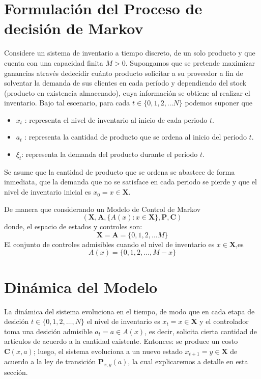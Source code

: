 \documentclass[
  us-letterpaper,
  DIV=11,
  numbers=noendperiod]{scrreprt}
\begin{document}

\chapter{Formulación del Proceso de decisión de
Markov}\label{formulaciuxf3n-del-proceso-de-decisiuxf3n-de-markov}

Considere un sistema de inventario a tiempo discreto, de un solo
producto y que cuenta con una capacidad finita \(M>0\). Supongamos que
se pretende maximizar ganancias através dedecidir cuánto producto
solicitar a su proveedor a fin de solventar la demanda de sus clientes
en cada período y dependiendo del stock (producto en existencia
almacenado), cuya información se obtiene al realizar el inventario. Bajo
tal escenario, para cada \(t\in \{0,1,2, \dotso N\}\) podemos suponer
que

\begin{itemize}
\item
  \(x_t\) : representa el nivel de inventario al inicio de cada periodo
  \(t\).
\item
  \(a_t\) : representa la cantidad de producto que se ordena al inicio
  del periodo \(t\).
\item
  \(\xi_t\): representa la demanda del producto durante el periodo
  \(t\).
\end{itemize}

Se asume que la cantidad de producto que se ordena se abastece de forma
inmediata, que la demanda que no se satisface en cada periodo se pierde
y que el nivel de inventario inicial es \(x_0=x \in \mathbf{X}\).

De manera que considerando un Modelo de Control de Markov
\[( \mathbf{X}, \mathbf{A}, \{A(x): x \in \mathbf{X}\}, \mathbf{P},\mathbf{C})\]
donde, el espacio de estados y controles son:
\[\mathbf{X}=\mathbf{A}=\{0,1,2, \dotso M\}\] El conjunto de controles
admisibles cuando el nivel de inventario es \(x\in\mathbf{X}\),es
\[A(x)=\{0,1,2, \dotso,M-x\}\]


\chapter{Dinámica del Modelo}\label{dinuxe1mica-del-modelo}

La dinámica del sistema evoluciona en el tiempo, de modo que en cada
etapa de desición \(t\in \{ 0,1,2, \dotso,N \}\) el nivel de inventario
es \(x_t=x \in \mathbf{X}\) y el controlador toma una desición admisible
\(a_t= a \in A(x)\), es decir, solicita cierta cantidad de articulos de
acuerdo a la cantidad existente. Entonces: se produce un costo
\(\mathbf{C}(x,a)\); luego, el sistema evoluciona a un nuevo estado
\(x_{t+1}=y \in \mathbf{X}\) de acuerdo a la ley de transición
\(\mathbf{P}_{x,y}(a)\), la cual explicaremos a detalle en esta sección.
\end{document}
